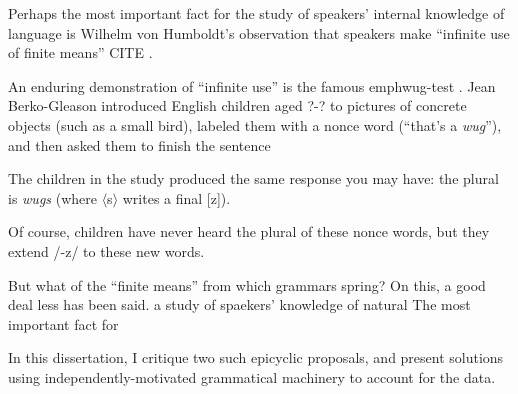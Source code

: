 
Perhaps the most important fact for the study of speakers' internal knowledge of language is Wilhelm von Humboldt's observation that speakers make ``infinite use of finite means'' CITE \citep{Chomsky1966}. 

An enduring demonstration of ``infinite use'' is the famous emph{wug-test} \citep{Berko1958}. Jean Berko-Gleason introduced English children aged ?-? to pictures of concrete objects (such as a small bird), labeled them with a nonce word (``that's a \emph{wug}''), and then asked them to finish the sentence

The children in the study produced the same response you may have: the plural is \emph{wugs} (where $\langle$s$\rangle$ writes a final [z]). 

Of course, children have never heard the plural of these nonce words, but they extend /-z/ to these new words. 

But what of the ``finite means'' from which grammars spring? On this, a good deal less has been said.
a study of spaekers' knowledge of natural
The most important fact for 

In this dissertation, I critique two such epicyclic proposals, and present solutions using independently-motivated grammatical machinery to account for the data. 
